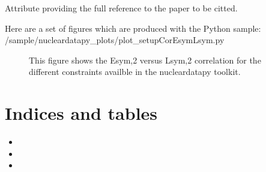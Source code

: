 \documentclass[letterpaper,10pt,english]{sphinxmanual}
\begin{document}
\begin{fulllineitems}
\begin{fulllineitems}
\end{fulllineitems}


\begin{fulllineitems}
\label{\detokenize{source/api/setup_CorEsymLsym:nucleardatapy.setup_CorEsymLsym.SetupCorEsymLsym.ref}}
\pysigstartsignatures
\pysigline
{}
\pysigstopsignatures
\sphinxAtStartPar
Attribute providing the full reference to the paper to be citted.

\end{fulllineitems}


\end{fulllineitems}


\sphinxAtStartPar
Here are a set of figures which are produced with the Python sample: /sample/nucleardatapy\_plots/plot\_setupCorEsymLsym.py

\begin{figure}[htbp]
\centering
\capstart

\noindent{}
\caption{This figure shows the Esym,2 versus Lsym,2 correlation for the different constraints availble in the nucleardatapy toolkit.}\label{\detokenize{source/api/setup_CorEsymLsym:id1}}\end{figure}


\chapter{Indices and tables}
\label{\detokenize{index:indices-and-tables}}\begin{itemize}
\item {} 
\sphinxAtStartPar
{}

\item {} 
\sphinxAtStartPar
{}

\item {} 
\sphinxAtStartPar
{}

\end{itemize}
\end{document}
